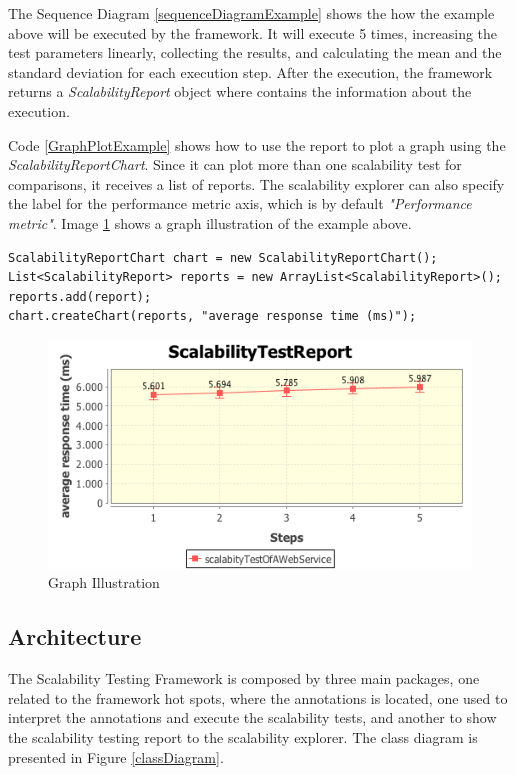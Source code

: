 The Sequence Diagram \ref{sequenceDiagramExample} shows the how the example above will be executed by the framework. It will execute 5 times, increasing the test parameters linearly, collecting the results, and calculating the mean and the standard deviation for each execution step. After the execution, the framework returns a \emph{ScalabilityReport} object where contains the information about the execution.

Code \ref{GraphPlotExample} shows how to use the report to plot a graph using the \emph{ScalabilityReportChart}. Since it can plot more than one scalability test for comparisons, it receives a list of reports. The scalability explorer can also specify the label for the performance metric axis, which is by default \emph{"Performance metric"}. Image \ref{graphIllustration} shows a graph illustration of the example above.

\begin{lstlisting}
ScalabilityReportChart chart = new ScalabilityReportChart();
List<ScalabilityReport> reports = new ArrayList<ScalabilityReport>();
reports.add(report);
chart.createChart(reports, "average response time (ms)");
\end{lstlisting}

\begin{figure}[t]
\begin{center}
	\includegraphics[scale=0.7]{images/graphExample}
\caption{Graph Illustration}
\label{graphIllustration}
\end{center}
\end{figure}

\subsection{Architecture}
The Scalability Testing Framework is composed by three main packages, one related to the framework hot spots, where the annotations is located, one used to interpret the annotations and execute the scalability tests, and another to show the scalability testing report to the scalability explorer. The class diagram is presented in Figure \ref{classDiagram}.

